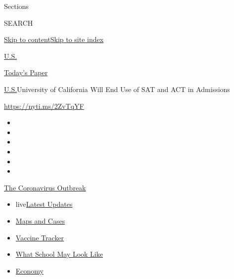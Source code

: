 Sections

SEARCH

\protect\hyperlink{site-content}{Skip to
content}\protect\hyperlink{site-index}{Skip to site index}

\href{https://www.nytimes.com/section/us}{U.S.}

\href{https://myaccount.nytimes.com/auth/login?response_type=cookie\&client_id=vi}{}

\href{https://www.nytimes.com/section/todayspaper}{Today's Paper}

\href{/section/us}{U.S.}\textbar{}University of California Will End Use
of SAT and ACT in Admissions

\url{https://nyti.ms/2ZvTqYF}

\begin{itemize}
\item
\item
\item
\item
\item
\item
\end{itemize}

\href{https://www.nytimes.com/news-event/coronavirus?action=click\&pgtype=Article\&state=default\&region=TOP_BANNER\&context=storylines_menu}{The
Coronavirus Outbreak}

\begin{itemize}
\tightlist
\item
  live\href{https://www.nytimes.com/2020/08/02/world/coronavirus-updates.html?action=click\&pgtype=Article\&state=default\&region=TOP_BANNER\&context=storylines_menu}{Latest
  Updates}
\item
  \href{https://www.nytimes.com/interactive/2020/us/coronavirus-us-cases.html?action=click\&pgtype=Article\&state=default\&region=TOP_BANNER\&context=storylines_menu}{Maps
  and Cases}
\item
  \href{https://www.nytimes.com/interactive/2020/science/coronavirus-vaccine-tracker.html?action=click\&pgtype=Article\&state=default\&region=TOP_BANNER\&context=storylines_menu}{Vaccine
  Tracker}
\item
  \href{https://www.nytimes.com/interactive/2020/07/29/us/schools-reopening-coronavirus.html?action=click\&pgtype=Article\&state=default\&region=TOP_BANNER\&context=storylines_menu}{What
  School May Look Like}
\item
  \href{https://www.nytimes.com/live/2020/07/31/business/stock-market-today-coronavirus?action=click\&pgtype=Article\&state=default\&region=TOP_BANNER\&context=storylines_menu}{Economy}
\end{itemize}

